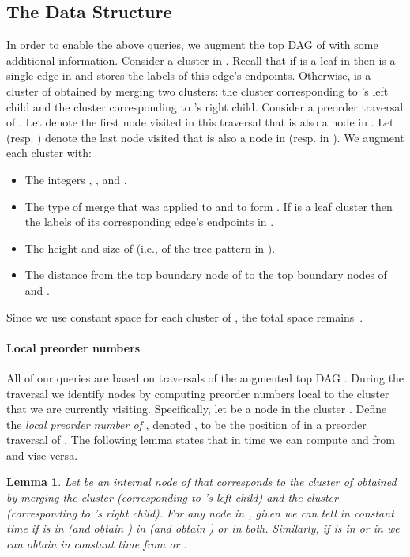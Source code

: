 \documentclass [11pt]{article}
\newtheorem{lemma}{Lemma}
\begin{document}
\subsection{The Data Structure}
In order to enable the above queries, we augment the top DAG  of  with some additional information. Consider a cluster  in . Recall that if  is a leaf in  then  is a single edge in  and  stores the labels of this edge's endpoints. Otherwise,  is a cluster of  obtained by merging two clusters: the cluster   corresponding to 's left child and the cluster  corresponding to 's right child. Consider a preorder traversal of . Let  denote the first node visited in this traversal that is also a node in . Let  (resp. ) denote the last node visited that is also a node in  (resp. in ). 
We augment each cluster  with:

\begin{itemize}
\item[] The integers , , and . 
\item[] The type of merge that was applied to  and  to form . If  is a leaf cluster then the labels of its corresponding edge's endpoints in .
\item[] The height and size of  (i.e., of the tree pattern  in ).
\item[] The distance from the top boundary node of  to the top boundary nodes of  and .    
\end{itemize} 
Since we use constant space for each cluster of , the total space remains~. 

\paragraph{Local preorder numbers}
All of our queries are based on traversals of the augmented top DAG . During the traversal we identify nodes by computing preorder numbers  local to the cluster that we are currently visiting. Specifically, let  be a node in the cluster . Define the \emph{local preorder number of }, denoted , to be the position of  in a preorder traversal of . The following lemma states that in  time we can compute  and  from  and vise versa.  


\begin{lemma}\label{lem:localpreorder}
Let  be an internal node of  that corresponds to the cluster  of  obtained by merging the cluster   (corresponding to 's left child) and the cluster   (corresponding to 's right child).
For any node  in , given  we can tell in constant time if  is in  (and obtain ) in  (and obtain ) or in both. Similarly, if  is in  or in  we can obtain  in constant time from  or .
\end{lemma}
\end{document}
